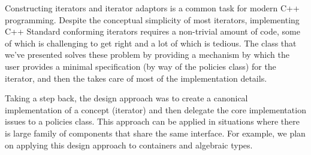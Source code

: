 \documentclass{netobjectdays}
\begin{document}
Constructing iterators and iterator adaptors is a common task for
modern C++ programming. Despite the conceptual simplicity of most
iterators, implementing {C++} Standard conforming iterators requires a
non-trivial amount of code, some of which is challenging to get right
and a lot of which is tedious. The  class that
we've presented solves these problem by providing a mechanism
by which the user provides a minimal specification (by way of the
policies class) for the iterator, and then the
 takes care of most of the implementation
details.

Taking a step back, the design approach was to create a canonical
implementation of a concept (iterator) and then delegate the core
implementation issues to a policies class. This approach can be
applied in situations where there is large family of components that
share the same interface. For example, we plan on applying this design
approach to containers and algebraic types.



\end{document}
